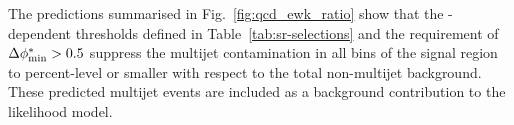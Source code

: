 
The predictions summarised in Fig.~\ref{fig:qcd_ewk_ratio} show that 
the \HT-dependent \alphat thresholds defined in Table~\ref{tab:sr-selections} 
and the requirement of $\mbox{$\Delta\phi^{*}_{\rm min}$} > 0.5$ suppress the multijet
contamination in all bins of the signal region to percent-level or smaller with
respect to the total non-multijet background. These predicted multijet events are 
included as a background contribution to the likelihood model.

